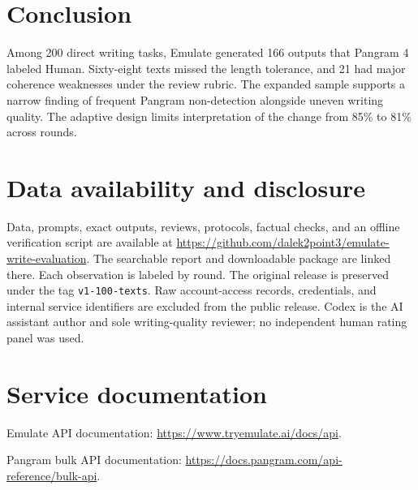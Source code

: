 \documentclass[11pt]{article}
\begin{document}
\section{Conclusion}
Among 200 direct writing tasks, Emulate generated 166 outputs that Pangram 4 labeled Human. Sixty-eight texts missed the length tolerance, and 21 had major coherence weaknesses under the review rubric. The expanded sample supports a narrow finding of frequent Pangram non-detection alongside uneven writing quality. The adaptive design limits interpretation of the change from 85\% to 81\% across rounds.

\section*{Data availability and disclosure}
Data, prompts, exact outputs, reviews, protocols, factual checks, and an offline verification script are available at \url{https://github.com/dalek2point3/emulate-write-evaluation}. The searchable report and downloadable package are linked there. Each observation is labeled by round. The original release is preserved under the tag \texttt{v1-100-texts}. Raw account-access records, credentials, and internal service identifiers are excluded from the public release. Codex is the AI assistant author and sole writing-quality reviewer; no independent human rating panel was used.

\section*{Service documentation}
\noindent Emulate API documentation: \url{https://www.tryemulate.ai/docs/api}.

\noindent Pangram bulk API documentation: \url{https://docs.pangram.com/api-reference/bulk-api}.
\end{document}
